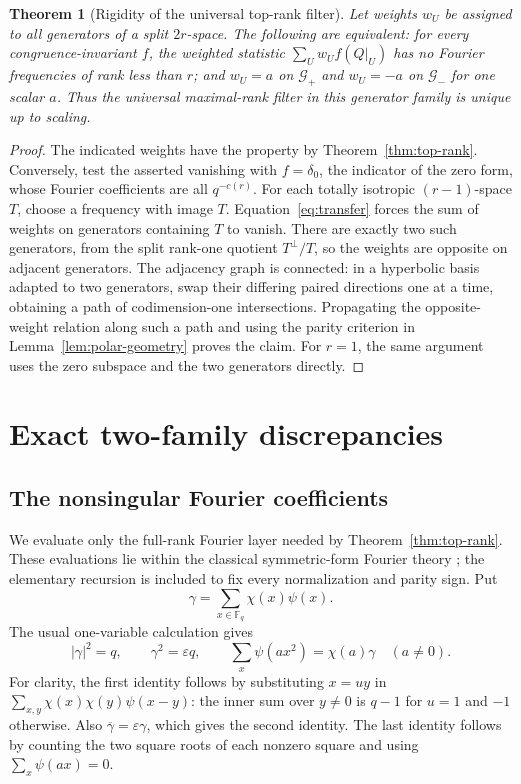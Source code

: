 \documentclass[11pt,a4paper]{article}
\newtheorem{theorem}{Theorem}[section]
\theoremstyle{definition}
\theoremstyle{remark}
\newcommand{\F}{\mathbb F}
\newcommand{\eps}{\varepsilon}
\newcommand{\G}{\mathcal G}
\begin{document}
\begin{theorem}[Rigidity of the universal top-rank filter]
\label{thm:filter-rigidity}
Let weights $w_U$ be assigned to all generators of a split $2r$-space.
The following are equivalent: for every congruence-invariant $f$, the
weighted statistic $\sum_Uw_Uf(Q|_U)$ has no Fourier frequencies of rank
less than $r$; and $w_U=a$ on $\G_+$ and $w_U=-a$ on $\G_-$ for one scalar
$a$. Thus the universal maximal-rank filter in this generator family is
unique up to scaling.
\end{theorem}
\begin{proof}
The indicated weights have the property by Theorem~\ref{thm:top-rank}.
Conversely, test the asserted vanishing with $f=\delta_0$, the indicator
of the zero form, whose Fourier coefficients are all $q^{-c(r)}$.
For each totally isotropic $(r-1)$-space $T$, choose a frequency with
image $T$. Equation~\eqref{eq:transfer} forces the sum of weights on
generators containing $T$ to vanish. There are exactly two such
generators, from the split rank-one quotient $T^\perp/T$, so the weights
are opposite on adjacent generators. The adjacency graph is connected:
in a hyperbolic basis adapted to two generators, swap their differing
paired directions one at a time, obtaining a path of codimension-one
intersections. Propagating the opposite-weight relation along such a
path and using the parity criterion in Lemma~\ref{lem:polar-geometry}
proves the claim. For $r=1$, the same argument uses the zero subspace
and the two generators directly.
\end{proof}

\section{Exact two-family discrepancies}
\label{sec:contrast}
\subsection{The nonsingular Fourier coefficients}
We evaluate only the full-rank Fourier layer needed by
Theorem~\ref{thm:top-rank}. These evaluations lie within the classical
symmetric-form Fourier theory \cite{schmidt2015,schmidt2020}; the elementary
recursion is included to fix every normalization and parity sign.
Put
\[
 \gamma=\sum_{x\in\F_q}\chi(x)\psi(x).
\]
The usual one-variable calculation gives
\begin{equation}\label{eq:gauss}
 |\gamma|^2=q,\qquad \gamma^2=\eps q,\qquad
 \sum_x\psi(ax^2)=\chi(a)\gamma\quad(a\ne0).
\end{equation}
For clarity, the first identity follows by substituting $x=uy$ in
$\sum_{x,y}\chi(x)\chi(y)\psi(x-y)$: the inner sum over $y\ne0$ is
$q-1$ for $u=1$ and $-1$ otherwise. Also
$\overline\gamma=\eps\gamma$, which gives the second identity.
The last identity follows by counting the two square roots of each
nonzero square and using $\sum_x\psi(ax)=0$.
\end{document}
